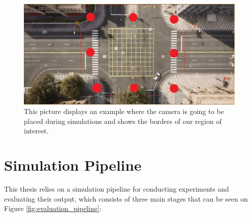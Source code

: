 \begin{figure} [h]
    \centering
    \includegraphics[width=\textwidth]{images/junction.png}
    \caption[Camera experiment positions]{This picture displays an example where the camera is going to be placed during simulations and shows the borders of our region of interest.}
    \label{fig:camera_positions}
\end{figure}

\section{Simulation Pipeline} \label{sec:sim_pipeline}

This thesis relies on a simulation pipeline for conducting experiments and evaluating their output, which consists of three main stages that can be seen on Figure \ref{fig:evaluation_pipeline}: 

